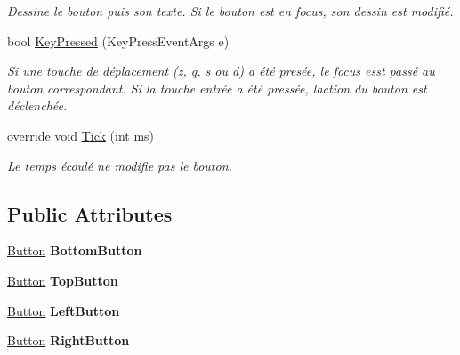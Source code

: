 \begin{DoxyCompactItemize}
\begin{DoxyCompactList}\small\item\em Dessine le bouton puis son texte. Si le bouton est en focus, son dessin est modifié. \end{DoxyCompactList}\item 
bool \hyperlink{class_tentacle_slicers_1_1hud_1_1_button_a8e379b3bd0f28f878101658bb90d7e41}{Key\+Pressed} (Key\+Press\+Event\+Args e)
\begin{DoxyCompactList}\small\item\em Si une touche de déplacement (z, q, s ou d) a été presée, le focus esst passé au bouton correspondant. Si la touche entrée a été pressée, l\textquotesingle{}action du bouton est déclenchée. \end{DoxyCompactList}\item 
override void \hyperlink{class_tentacle_slicers_1_1hud_1_1_button_a47c46346d353d9a9bb23a65ae27490d2}{Tick} (int ms)
\begin{DoxyCompactList}\small\item\em Le temps écoulé ne modifie pas le bouton. \end{DoxyCompactList}\end{DoxyCompactItemize}
\subsection*{Public Attributes}
\begin{DoxyCompactItemize}
\item 
\mbox{\label{class_tentacle_slicers_1_1hud_1_1_button_aa602a1408b2643d25f2dde4bdf8f9514}} 
\hyperlink{class_tentacle_slicers_1_1hud_1_1_button}{Button} {\bfseries Bottom\+Button}
\item 
\mbox{\label{class_tentacle_slicers_1_1hud_1_1_button_aecf84c3432c96e42412ddacbbdedc80e}} 
\hyperlink{class_tentacle_slicers_1_1hud_1_1_button}{Button} {\bfseries Top\+Button}
\item 
\mbox{\label{class_tentacle_slicers_1_1hud_1_1_button_ae5e4924fbcc09e678254609465c35e64}} 
\hyperlink{class_tentacle_slicers_1_1hud_1_1_button}{Button} {\bfseries Left\+Button}
\item 
\mbox{\label{class_tentacle_slicers_1_1hud_1_1_button_a1f162e93a3470f716e4129e038d280e0}} 
\hyperlink{class_tentacle_slicers_1_1hud_1_1_button}{Button} {\bfseries Right\+Button}
\end{DoxyCompactItemize}
